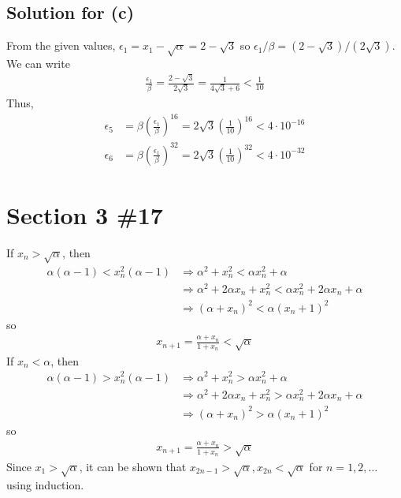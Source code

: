 \documentclass{scrartcl}
\begin{document}
\subsection{Solution for (c)}
From the given values, \(\epsilon_1 = x_1 - \sqrt\alpha = 2 - \sqrt3\) so \(\epsilon_1 / \beta = (2 - \sqrt3) / (2\sqrt3)\).
We can write
\begin{align*}
  \frac{\epsilon_1}{\beta} = \frac{2 - \sqrt3}{2\sqrt3} = \frac{1}{4\sqrt3 + 6} < \frac{1}{10}
\end{align*}
Thus,
\begin{align*}
  \epsilon_5 &= \beta \left( \frac{\epsilon_1}{\beta} \right)^{16} = 2\sqrt3 \left( \frac{1}{10} \right)^{16} < 4 \cdot 10^{-16} \\
  \epsilon_6 &= \beta \left( \frac{\epsilon_1}{\beta} \right)^32 = 2\sqrt3 \left( \frac{1}{10} \right)^32 < 4 \cdot 10^{-32}
\end{align*}

\section{Section 3 \#17}
If \(x_n > \sqrt\alpha\), then
\begin{align*}
  \alpha(\alpha - 1) < x_n^2(\alpha - 1) &\Longrightarrow \alpha^2 + x_n^2 < \alpha x_n^2 + \alpha \\
                                         &\Longrightarrow \alpha^2 + 2\alpha x_n + x_n^2 < \alpha x_n^2 + 2\alpha x_n + \alpha \\
                                         &\Longrightarrow (\alpha + x_n)^2 < \alpha (x_n + 1)^2
\end{align*}
so
\begin{align*}
  x_{n + 1} = \frac{\alpha + x_n}{1 + x_n} < \sqrt\alpha
\end{align*}
If \(x_n < \alpha\), then
\begin{align*}
  \alpha (\alpha - 1) > x_n^2 (\alpha - 1) &\Longrightarrow \alpha^2 + x_n^2 > \alpha x_n^2 + \alpha \\
                                           &\Longrightarrow \alpha^2 + 2\alpha x_n + x_n^2 > \alpha x_n^2 + 2\alpha x_n + \alpha \\
                                           &\Longrightarrow (\alpha + x_n)^2 > \alpha(x_n + 1)^2
\end{align*}
so
\begin{align*}
  x_{n + 1} = \frac{\alpha + x_n}{1 + x_n} > \sqrt\alpha
\end{align*}
Since \(x_1 > \sqrt\alpha\), it can be shown that \(x_{2n - 1} > \sqrt\alpha, x_{2n} < \sqrt\alpha\) for \(n = 1, 2, \dots\) using induction.
\end{document}
